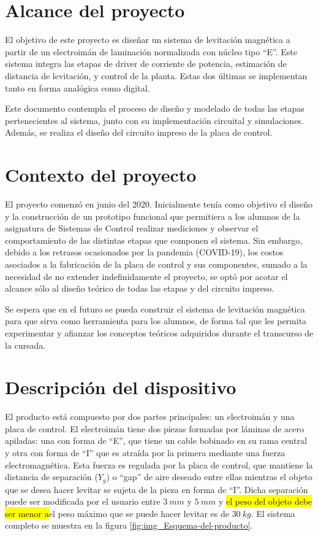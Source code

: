 \section{Alcance del proyecto}

\noindent El objetivo de este proyecto es diseñar un sistema de levitación magnética a partir de un electroimán de laminación normalizada con núcleo tipo “E''. Este sistema integra las etapas de driver de corriente de potencia, estimación de distancia de levitación, y control de la planta. Estas dos últimas se implementan tanto en forma analógica como digital.

\noindent Este documento contempla el proceso de diseño y modelado de todas las etapas pertenecientes al sistema, junto con su implementación circuital y simulaciones. Además, se realiza el diseño del circuito impreso de la placa de control.



\section{Contexto del proyecto}

\noindent El proyecto comenzó en junio del 2020. Inicialmente tenía como objetivo el diseño y la construcción de un prototipo funcional que permitiera a los alumnos de la asignatura de Sistemas de Control realizar mediciones y observar el comportamiento de las distintas etapas que componen el sistema. Sin embargo, debido a los retrasos ocasionados por la pandemia (COVID-19), los costos asociados a la fabricación de la placa de control y sus componentes, sumado a la  necesidad de no extender indefinidamente el proyecto, se optó por acotar el alcance sólo al diseño teórico de todas las etapas y del circuito impreso.

\noindent Se espera que en el futuro se pueda construir el sistema de levitación magnética para que sirva como herramienta para los alumnos, de forma tal que les permita experimentar y afianzar los conceptos teóricos adquiridos durante el transcurso de la cursada.



\section{Descripción del dispositivo}

\noindent El producto está compuesto por dos partes principales: un electroimán y una placa de control. El electroimán tiene dos piezas formadas por láminas de acero apiladas: una con forma de “E”, que tiene un cable bobinado en su rama central y otra con forma de “I” que es atraída por la primera mediante una fuerza electromagnética. Esta fuerza es regulada por la placa de control, que mantiene la distancia de separación ($Y_{g}$) o “gap” de aire deseado entre ellas mientras el objeto que se desea hacer levitar se sujeta de la pieza en forma de “I”. Dicha separación puede ser modificada por el usuario entre $3\:mm$ y $5\:mm$ y \colorbox{yellow}{ el peso del objeto debe ser menor a}el peso máximo que se puede hacer levitar es de $30\:kg$. El sistema completo se muestra en la figura \ref{fig:img_Esquema-del-producto}.

